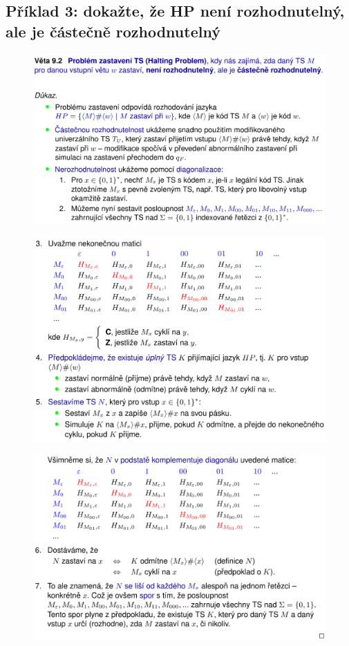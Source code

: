 \subsection*{Příklad 3: dokažte, že HP není rozhodnutelný, ale je částečně rozhodnutelný}

\begin{figure}[H]
    \centering
    \includegraphics[width=1\linewidth]{diagonalizace_pr3_p1.pdf}
\end{figure}

\begin{figure}[H]
    \centering
    \includegraphics[width=1\linewidth]{diagonalizace_pr3_p2.pdf}
\end{figure}

\begin{figure}[H]
    \centering
    \includegraphics[width=1\linewidth]{diagonalizace_pr3_p3.pdf}
\end{figure}

